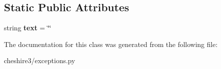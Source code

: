 \subsection*{Static Public Attributes}
\begin{DoxyCompactItemize}
\item 
\hypertarget{classcheshire3_1_1exceptions_1_1_c3_exception_a07bd8647a7f1e807e9e018a9446633a3}{string {\bfseries text} = \char`\"{}\char`\"{}}\label{classcheshire3_1_1exceptions_1_1_c3_exception_a07bd8647a7f1e807e9e018a9446633a3}

\end{DoxyCompactItemize}


The documentation for this class was generated from the following file\-:\begin{DoxyCompactItemize}
\item 
cheshire3/exceptions.\-py\end{DoxyCompactItemize}
